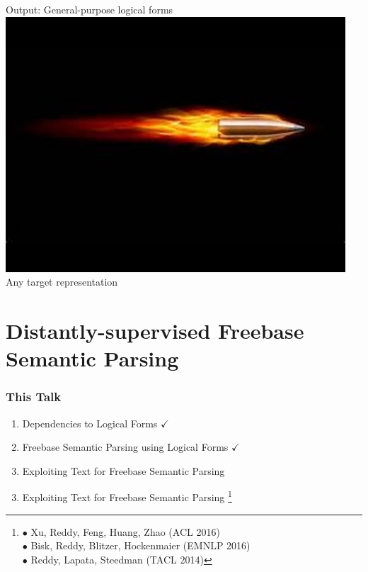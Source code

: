 \documentclass[mathserif,12pt]{beamer}
\newcommand\blfootnote[1]{%
  \begingroup
  \renewcommand\thefootnote{}\footnote{#1}%
  \addtocounter{footnote}{-1}%
  \endgroup
}
\begin{document}
\begin{frame}
\pause
\vspace{2em}
Output: General-purpose logical forms\\
\pause \includegraphics[trim=16em 14em 4em 10em,clip=true,scale=0.2]{figures/bullet}\; Any target representation
\end{frame}

\section{Distantly-supervised Freebase Semantic Parsing}
\begin{frame}
\frametitle{This Talk}
\large 
\begin{enumerate}
 \item Dependencies to Logical Forms $\checkmark$
 
 \vspace{2em}
 \item Freebase Semantic Parsing using Logical Forms $\checkmark$
 
 \vspace{2em}
 \item Exploiting Text for Freebase Semantic Parsing
\end{enumerate}
\end{frame}

\begin{frame}
\Large
\centering
\vspace{1.5em}
\begin{enumerate}
 \setcounter{enumi}{2}
 \item Exploiting Text for Freebase Semantic Parsing \blfootnote{\color{blue} 
   $\bullet$ Xu, Reddy, Feng, Huang, Zhao (ACL 2016) \\
   \hspace{1.6em} $\bullet$ Bisk, Reddy, Blitzer, Hockenmaier (EMNLP 2016) \\
   \hspace{1.6em} $\bullet$ Reddy, Lapata, Steedman (TACL 2014)}
\end{enumerate}
\end{frame}
\end{document}

